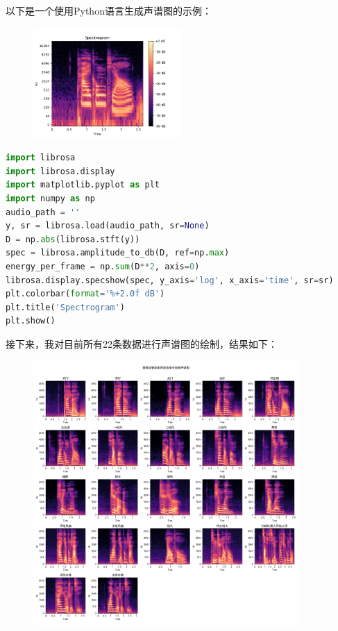 \documentclass[lang=cn]{elegantpaper}
\begin{document}
以下是一个使用Python语言生成声谱图的示例：
\begin{figure}[h]
    \centering
    \includegraphics[width=0.5\textwidth]{testspectrogram.png}
\end{figure}
\begin{lstlisting}[language=Python]
import librosa
import librosa.display
import matplotlib.pyplot as plt
import numpy as np
audio_path = ''
y, sr = librosa.load(audio_path, sr=None)
D = np.abs(librosa.stft(y))
spec = librosa.amplitude_to_db(D, ref=np.max)
energy_per_frame = np.sum(D**2, axis=0)
librosa.display.specshow(spec, y_axis='log', x_axis='time', sr=sr)
plt.colorbar(format='%+2.0f dB')
plt.title('Spectrogram')
plt.show()
\end{lstlisting}
接下来，我对目前所有22条数据进行声谱图的绘制，结果如下：
\begin{figure}[h]
    \centering
    \includegraphics[width=0.9\textwidth]{spectrogram.png}
\end{figure}
\end{document}
